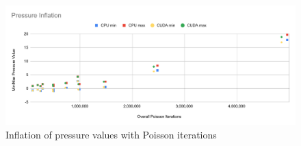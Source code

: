 \begin{figure}
    \centering
    \includegraphics[width=\linewidth]{Ch62Results/figures/temp_pressure_inflation.pdf}
    \caption{Inflation of pressure values with Poisson iterations}
    \label{fig:results:pressure_inflation}
\end{figure}
